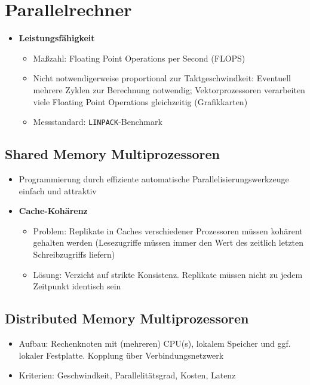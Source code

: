 \section{Parallelrechner}
\begin{itemize}
	\item \textbf{Leistungsfähigkeit}
	\begin{itemize}
		\item Maßzahl: Floating Point Operations per Second (FLOPS)
		\item Nicht notwendigerweise proportional zur Taktgeschwindkeit: Eventuell mehrere Zyklen zur Berechnung notwendig; Vektorprozessoren verarbeiten viele Floating Point Operations gleichzeitig (Grafikkarten)
		\item Messstandard: \texttt{LINPACK}-Benchmark
	\end{itemize}
\end{itemize}

\subsection{Shared Memory Multiprozessoren}
\begin{itemize}
	\item Programmierung durch effiziente automatische Parallelisierungswerkzeuge einfach und attraktiv
	\item \textbf{Cache-Kohärenz}
	\begin{itemize}
		\item Problem: Replikate in Caches verschiedener Prozessoren müssen kohärent gehalten werden (Lesezugriffe müssen immer den Wert des zeitlich letzten Schreibzugriffs liefern)
		\item Lösung: Verzicht auf strikte Konsistenz. Replikate müssen nicht zu jedem Zeitpunkt identisch sein
	\end{itemize}
\end{itemize}


\subsection{Distributed Memory Multiprozessoren}
\begin{itemize}
	\item Aufbau: Rechenknoten mit (mehreren) CPU(s), lokalem Speicher und ggf. lokaler Festplatte. Kopplung über Verbindungsnetzwerk
	\item Kriterien: Geschwindkeit, Parallelitätsgrad, Kosten, Latenz
\end{itemize}

